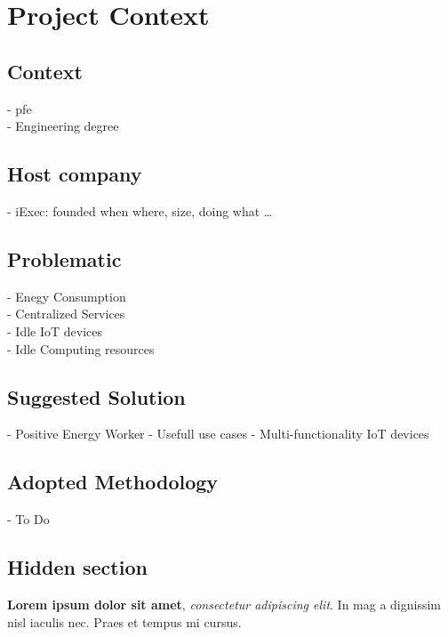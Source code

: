 
\chapter{Project Context}

\ifpdf
    \graphicspath{{2.0-Context/Figs/Raster/}{2.0-Context/Figs/PDF/}{2.0-Context/Figs/}}
\else
    \graphicspath{{2.0-Context/Figs/Vector/}{2.0-Context/Figs/}}
\fi

\section{Context}
- pfe \\
- Engineering degree

\section{Host company}
- iExec: founded when where, size, doing what \dots

\section{Problematic}
- Enegy Consumption \\
- Centralized Services \\
- Idle IoT devices \\
- Idle Computing resources 

\section{Suggested Solution}
- Positive Energy Worker
- Usefull use cases
- Multi-functionality IoT devices

\section{Adopted Methodology}
- To Do

\clearpage

\tochide\section{Hidden section}
\textbf{Lorem ipsum dolor sit amet}, \textit{consectetur adipiscing elit}. In mag a dignissim nisl iaculis nec. Praes et tempus mi cursus.

